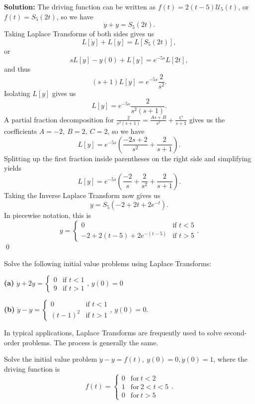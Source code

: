 {{{{\bf Solution:} The driving function can be written as $f(t)=2(t-5)\mathcal{U}_5(t)$, or $f(t)=S_5(2t)$, so we have
\[ \dot{y} + y = S_5(2t).\]
Taking Laplace Transforms of both sides gives us
\[ L [ \dot{y} ] + L[y] = L[S_5(2t)],\]
or
\[ sL[y]-y(0)+L[y] = e^{-5s} L[2t],\]
and thus
\[ (s+1)L[y] = e^{-5s}\frac{2}{s^2}.\]
Isolating $L[y]$ gives us
\[ L[y] = e^{-5s} \frac{2}{s^2(s+1)}.\]
A partial fraction decomposition for $\frac{2}{s^2(s+1)} = \frac{As+B}{s^2} + \frac{C}{s+1}$ gives us the coefficients $A=-2, \ B=2, \ C=2$, so we have
\[ L[y] = e^{-5s} \left( \frac{-2s+2}{s^2} + \frac{2}{s+1} \right).\]
Splitting up the first fraction inside parentheses on the right side and simplifying yields
\[ L[y] = e^{-5s} \left( \frac{-2}{s} + \frac{2}{s^2} + \frac{2}{s+1} \right).\]
Taking the Inverse Laplace Transform now gives us
\[ y = S_5 \left( -2 + 2t+2e^{-t} \right).\]
In piecewise notation, this is
\[ y = \begin{cases} 0 & \mbox{if } t<5 \\ -2 + 2(t-5) + 2e^{-(t-5)} & \mbox{if } t >5 \end{cases}.\]
\qed



\begin{exe} 
Solve the following initial value problems using Laplace Transforms:

{\bf (a)} $\dot{y}+2y = \begin{cases} 0 & \mbox{if } t < 1 \\ 9 & \mbox{if } t > 1 \end{cases}$, $y(0)=0$ 

{\bf (b)} $\dot{y}-y = \begin{cases} 0 & \mbox{if } t < 1 \\ (t-1)^2 & \mbox{if } t > 1 \end{cases}$, $y(0)=0$.
\end{exe}

In typical applications, Laplace Transforms are frequently used to solve second-order problems.  The process is generally the same.  

\example Solve the initial value problem $\ddot{y}-y=f(t), \ y(0)=0, \dot{y}(0)=1$, where the driving function is 
\[ f(t) = \left\{ \begin{matrix} 0 & \mbox{for} \ t<2 \\ 1 & \mbox{for} \ 2 <t<5 \\ 0 &\mbox{for} \ t>5 \end{matrix} \right. .\]

}}}
